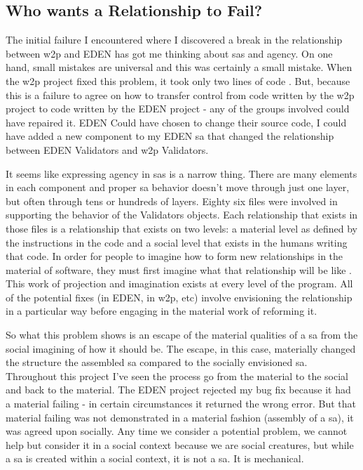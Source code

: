 \documentclass[a4paper,man,natbib,floatsintext]{apa6}
\begin{document}
  \subsection{Who wants a Relationship to Fail?}
  The initial failure I encountered where I discovered a break in the relationship between \gls{w2p} and \gls{EDEN} has got me thinking about \glspl{sa} and agency. On one hand, small mistakes are universal and this was certainly a small mistake. When the \gls{w2p} project fixed this problem, it took only two lines of code \citep{Konig2019-fw}. But, because this is a failure to agree on how to transfer control from code written by the \gls{w2p} project to code written by the \gls{EDEN} project - any of the groups involved could have repaired it. \gls{EDEN} Could have chosen to change their source code, I could have added a new component to my \gls{EDEN} \gls{sa} that changed the relationship between \gls{EDEN} Validators and \gls{w2p} Validators. 

  It seems like expressing agency in \glspl{sa} is a narrow thing. There are many elements in each component and proper \gls{sa} behavior doesn't move through just one layer, but often through tens or hundreds of layers. Eighty six files were involved in supporting the behavior of the Validators objects. Each relationship that exists in those files is a relationship that exists on two levels: a material level as defined by the instructions in the code and a social level that exists in the humans writing that code. In order for people to imagine how to form new relationships in the material of software, they must first imagine what that relationship will be like \citep{Mackenzie2006-hb}. This work of projection and imagination exists at every level of the program. All of the potential fixes (in \gls{EDEN}, in \gls{w2p}, etc) involve envisioning the relationship in a particular way before engaging in the material work of reforming it.

  So what this problem shows is an escape of the material qualities of a \gls{sa} from the social imagining of how it should be. The escape, in this case, materially changed the structure the assembled \gls{sa} compared to the socially envisioned \gls{sa}. Throughout this project I've seen the process go from the material to the social and back to the material. The \gls{EDEN} project rejected my bug fix because it had a material failing - in certain circumstances it returned the wrong error. But that material failing was not demonstrated in a material fashion (assembly of a \gls{sa}), it was agreed upon socially. Any time we consider a potential problem, we cannot help but consider it in a social context because we are social creatures, but while a \gls{sa} is created within a social context, it is not a \gls{sa}. It is mechanical.
\end{document}
